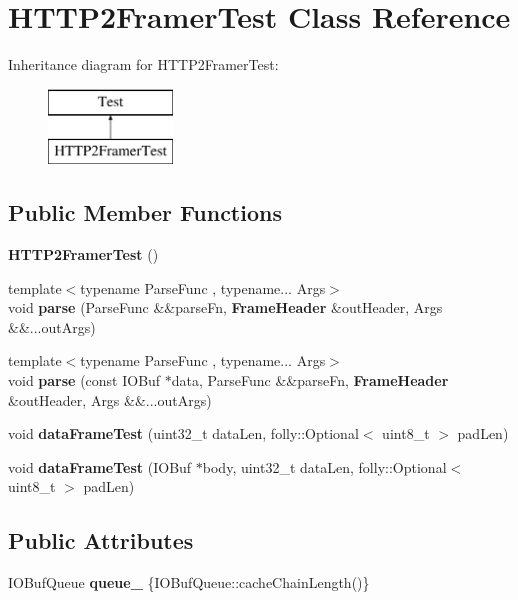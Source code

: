 \section{H\+T\+T\+P2\+Framer\+Test Class Reference}
\label{classHTTP2FramerTest}
Inheritance diagram for H\+T\+T\+P2\+Framer\+Test\+:\begin{figure}[H]
\begin{center}
\leavevmode
\includegraphics[height=2.000000cm]{classHTTP2FramerTest}
\end{center}
\end{figure}
\subsection*{Public Member Functions}
\begin{DoxyCompactItemize}
\item 
{\bf H\+T\+T\+P2\+Framer\+Test} ()
\item 
{\footnotesize template$<$typename Parse\+Func , typename... Args$>$ }\\void {\bf parse} (Parse\+Func \&\&parse\+Fn, {\bf Frame\+Header} \&out\+Header, Args \&\&...out\+Args)
\item 
{\footnotesize template$<$typename Parse\+Func , typename... Args$>$ }\\void {\bf parse} (const I\+O\+Buf $\ast$data, Parse\+Func \&\&parse\+Fn, {\bf Frame\+Header} \&out\+Header, Args \&\&...out\+Args)
\item 
void {\bf data\+Frame\+Test} (uint32\+\_\+t data\+Len, folly\+::\+Optional$<$ uint8\+\_\+t $>$ pad\+Len)
\item 
void {\bf data\+Frame\+Test} (I\+O\+Buf $\ast$body, uint32\+\_\+t data\+Len, folly\+::\+Optional$<$ uint8\+\_\+t $>$ pad\+Len)
\end{DoxyCompactItemize}
\subsection*{Public Attributes}
\begin{DoxyCompactItemize}
\item 
I\+O\+Buf\+Queue {\bf queue\+\_\+} \{I\+O\+Buf\+Queue\+::cache\+Chain\+Length()\}
\end{DoxyCompactItemize}


